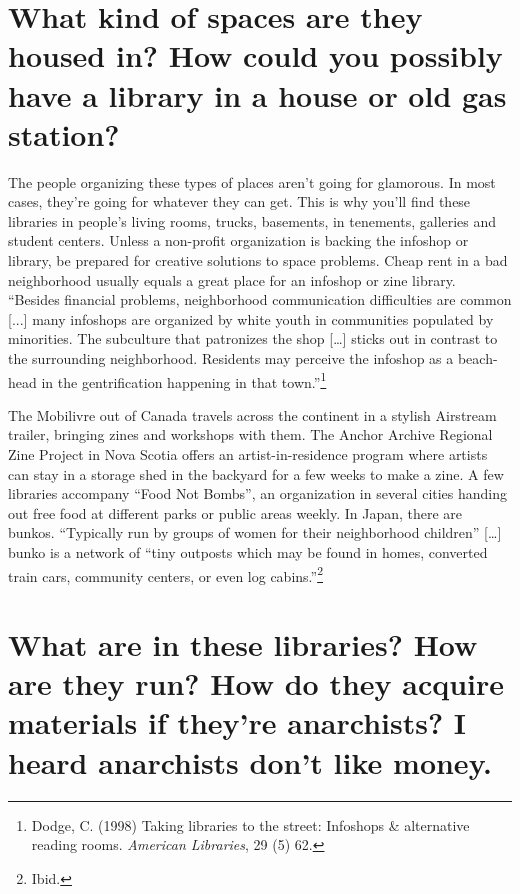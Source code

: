 \documentclass[output=paper]{langscibook}
\begin{document}
\hypertarget{what-kind-of-spaces-are-they-housed-in-how-could-you-possibly-have-a-library-in-a-house-or-old-gas-station}{%
\section{What kind of spaces are they housed in? How could you possibly
have a library in a house or old gas
station?}\label{what-kind-of-spaces-are-they-housed-in-how-could-you-possibly-have-a-library-in-a-house-or-old-gas-station}}

The people organizing these types of places aren't going for glamorous.
In most cases, they're going for whatever they can get. This is why
you'll find these libraries in people's living rooms, trucks, basements,
in tenements, galleries and student centers. Unless a non-profit
organization is backing the infoshop or library, be prepared for
creative solutions to space problems. Cheap rent in a bad neighborhood
usually equals a great place for an infoshop or zine library.
\enquote{Besides financial problems, neighborhood communication
difficulties are common {[}...{]} many infoshops are organized by white
youth in communities populated by minorities. The subculture that
patronizes the shop {[}\ldots{]} sticks out in contrast to the
surrounding neighborhood. Residents may perceive the infoshop as a
beach-head in the gentrification happening in that town.}\footnote{Dodge,
  C. (1998) Taking libraries to the street: Infoshops \& alternative
  reading rooms. \emph{American Libraries}, 29 (5) 62.}

The Mobilivre out of Canada travels across the continent in a stylish
Airstream trailer, bringing zines and workshops with them. The Anchor
Archive Regional Zine Project in Nova Scotia offers an
artist-in-residence program where artists can stay in a storage shed in
the backyard for a few weeks to make a zine. A few libraries accompany
\enquote{Food Not Bombs}, an organization in several cities handing out
free food at different parks or public areas weekly. In Japan, there are
bunkos. \enquote{Typically run by groups of women for their neighborhood
children} {[}\ldots{]} bunko is a network of \enquote{tiny outposts
which may be found in homes, converted train cars, community centers, or
even log cabins.}\footnote{Ibid.}

\hypertarget{what-are-in-these-libraries-how-are-they-run-how-do-they-acquire-materials-if-theyre-anarchists-i-heard-anarchists-dont-like-money.}{%
\section{What are in these libraries? How are they run? How do they
acquire materials if they're anarchists? I heard anarchists don't like
money.}\label{what-are-in-these-libraries-how-are-they-run-how-do-they-acquire-materials-if-theyre-anarchists-i-heard-anarchists-dont-like-money.}}
\end{document}
